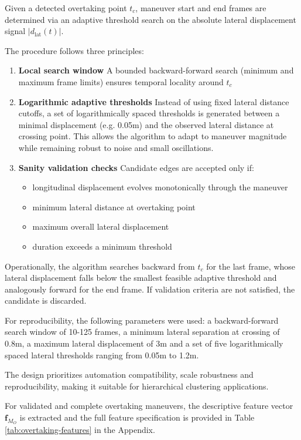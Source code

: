 Given a detected overtaking point $t_c$, maneuver start and end frames are determined via an adaptive threshold search on the absolute lateral displacement signal $|d_\text{lat}(t)|$.

The procedure follows three principles:

\begin{enumerate}
	\item \textbf{Local search window} A bounded backward-forward search (minimum and maximum frame limits) ensures temporal locality around $t_c$
	\item \textbf{Logarithmic adaptive thresholds} Instead of using fixed lateral distance cutoffs, a set of logarithmically spaced thresholds is generated between a minimal displacement (e.g. 0.05m) and the observed lateral distance at crossing point.
	This allows the algorithm to adapt to maneuver magnitude while remaining robust to noise and small oscillations.
	\item \textbf{Sanity validation checks} Candidate edges are accepted only if:
	\begin{itemize}
		\item longitudinal displacement evolves monotonically through the maneuver
		\item minimum lateral distance at overtaking point
		\item maximum overall lateral displacement
		\item duration exceeds a minimum threshold
	\end{itemize}
\end{enumerate}

Operationally, the algorithm searches backward from $t_c$ for the last frame, whose lateral displacement falls below the smallest feasible adaptive threshold and analogously forward for the end frame. If validation criteria are not satisfied, the candidate is discarded.

For reproducibility, the following parameters were used: a backward-forward search window of 10-125 frames, a minimum lateral separation at crossing of 0.8m, a maximum lateral displacement of 3m and a set of five logarithmically spaced lateral thresholds ranging from 0.05m to 1.2m.

The design prioritizes automation compatibility, scale robustness and reproducibility, making it suitable for hierarchical clustering applications.

For validated and complete overtaking maneuvers, the descriptive feature vector $\mathbf{f}_{M_O}$ is extracted and the full feature specification is provided in Table \ref{tab:overtaking-features} in the Appendix.

